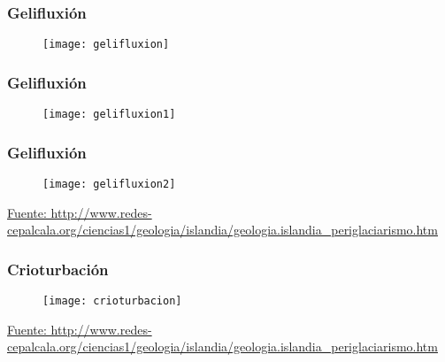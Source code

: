 \documentclass{beamer}
\begin{document}
\begin{frame}
\frametitle{Gelifluxión}
\begin{figure}
\begin{center}
\texttt{[image: gelifluxion]}
\end{center}
\end{figure}
\end{frame}
\begin{frame}
\frametitle{Gelifluxión}
\begin{figure}
\begin{center}
\texttt{[image: gelifluxion1]}
\end{center}
\end{figure}
\end{frame}
\begin{frame}
\frametitle{Gelifluxión}
\begin{figure}
\begin{center}
\texttt{[image: gelifluxion2]}
\end{center}
\end{figure}
\tiny{\url{Fuente: http://www.redes-cepalcala.org/ciencias1/geologia/islandia/geologia.islandia_periglaciarismo.htm}}
\end{frame}
\begin{frame}
\frametitle{Crioturbación}
\begin{figure}
\begin{center}
\texttt{[image: crioturbacion]}
\end{center}
\end{figure}
\tiny{\url{Fuente: http://www.redes-cepalcala.org/ciencias1/geologia/islandia/geologia.islandia_periglaciarismo.htm}}
\end{frame}
\end{document}
